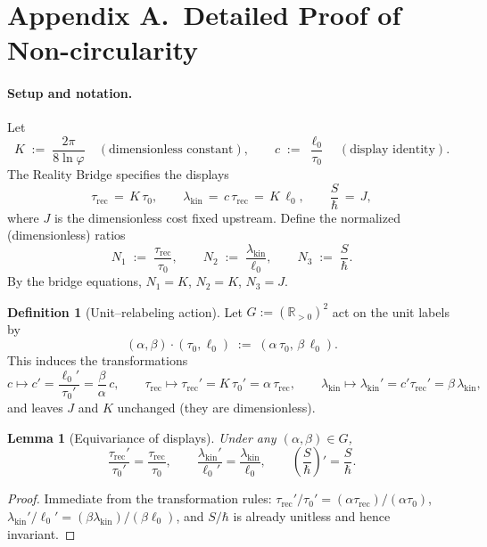 \documentclass[11pt]{article}
\theoremstyle{plain}
\newtheorem{lemma}{Lemma}
\theoremstyle{definition}
\newtheorem{definition}{Definition}
\theoremstyle{remark}
\begin{document}
\section*{Appendix A.\ Detailed Proof of Non-circularity}

\paragraph{Setup and notation.}
Let
\[
K\;:=\;\frac{2\pi}{8\ln\varphi}\quad(\text{dimensionless constant}),\qquad
c\;:=\;\frac{\ell_{0}}{\tau_{0}}\quad(\text{display identity}).
\]
The Reality Bridge specifies the displays
\[
\tau_{\mathrm{rec}}\,=\,K\,\tau_{0},\qquad
\lambda_{\mathrm{kin}}\,=\,c\,\tau_{\mathrm{rec}}\,=\,K\,\ell_{0},\qquad
\frac{S}{\hbar}\,=\,J,
\]
where \(J\) is the dimensionless cost fixed upstream. Define the normalized (dimensionless) ratios
\[
N_{1}\;:=\;\frac{\tau_{\mathrm{rec}}}{\tau_{0}},\qquad
N_{2}\;:=\;\frac{\lambda_{\mathrm{kin}}}{\ell_{0}},\qquad
N_{3}\;:=\;\frac{S}{\hbar}.
\]
By the bridge equations, \(N_{1}=K\), \(N_{2}=K\), \(N_{3}=J\).

\begin{definition}[Unit–relabeling action]
Let \(G:=(\mathbb{R}_{>0})^{2}\) act on the unit labels by
\[
(\alpha,\beta)\cdot(\tau_{0},\ell_{0})\;:=\;(\alpha\,\tau_{0},\,\beta\,\ell_{0}).
\]
This induces the transformations
\[
c\mapsto c'=\frac{\ell_{0}'}{\tau_{0}'}=\frac{\beta}{\alpha}\,c,\qquad
\tau_{\mathrm{rec}}\mapsto\tau_{\mathrm{rec}}'=K\,\tau_{0}'=\alpha\,\tau_{\mathrm{rec}},\qquad
\lambda_{\mathrm{kin}}\mapsto\lambda_{\mathrm{kin}}'=c'\tau_{\mathrm{rec}}'=\beta\,\lambda_{\mathrm{kin}},
\]
and leaves \(J\) and \(K\) unchanged (they are dimensionless).
\end{definition}

\begin{lemma}[Equivariance of displays]\label{lem:equivariance}
Under any \((\alpha,\beta)\in G\),
\[
\frac{\tau_{\mathrm{rec}}'}{\tau_{0}'}=\frac{\tau_{\mathrm{rec}}}{\tau_{0}},\qquad
\frac{\lambda_{\mathrm{kin}}'}{\ell_{0}'}=\frac{\lambda_{\mathrm{kin}}}{\ell_{0}},\qquad
\left(\frac{S}{\hbar}\right)'\!=\frac{S}{\hbar}.
\]
\end{lemma}

\begin{proof}
Immediate from the transformation rules: \(\tau_{\mathrm{rec}}'/\tau_{0}'=(\alpha\tau_{\mathrm{rec}})/(\alpha\tau_{0})\), \(\lambda_{\mathrm{kin}}'/\ell_{0}'=(\beta\lambda_{\mathrm{kin}})/(\beta\ell_{0})\), and \(S/\hbar\) is already unitless and hence invariant.
\end{proof}
\end{document}
